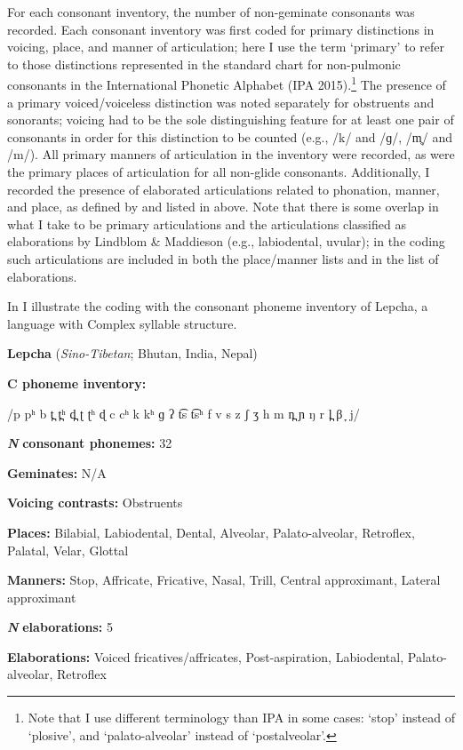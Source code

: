  For each consonant inventory, the number of non-geminate consonants was recorded. Each consonant inventory was first coded for primary distinctions in voicing, place, and manner of articulation; here I use the term ‘primary’ to refer to those distinctions represented in the standard chart for non-pulmonic consonants in the International Phonetic Alphabet (IPA 2015).\footnote{{Note that I use different terminology than IPA in some cases: ‘stop’ instead of ‘plosive’, and ‘palato-alveolar’ instead of ‘postalveolar’.}} The presence of a primary voiced/voiceless distinction was noted separately for obstruents and sonorants; voicing had to be the sole distinguishing feature for at least one pair of consonants in order for this distinction to be counted (e.g., /k/ and /ɡ/, /m̥/ and /m/). All primary manners of articulation in the inventory were recorded, as were the primary places of articulation for all non-glide consonants. Additionally, I recorded the presence of elaborated articulations related to phonation, manner, and place, as defined by \citet{LindblomMaddieson1988} and listed in  above. Note that there is some overlap in what I take to be primary articulations and the articulations classified as elaborations by Lindblom \& Maddieson (e.g., labiodental, uvular); in the coding such articulations are included in both the place/manner lists and in the list of elaborations.

  In  I illustrate the coding with the consonant phoneme inventory of Lepcha, a language with Complex syllable structure.

\ea\label{ex:4.10}
  \textbf{Lepcha} (\textit{Sino-Tibetan}; Bhutan, India, Nepal)

\textbf{C phoneme inventory:} 

/p pʰ b t̪ t̪ʰ d̪ ʈ ʈʰ ɖ c cʰ k kʰ ɡ ʔ t͡s t͡sʰ f v s z ʃ ʒ h m n̪ ɲ ŋ r l̪ β ̞ j/

\textbf{\textit{N}} \textbf{consonant phonemes:} 32

\textbf{Geminates:} N/A

\textbf{Voicing contrasts:} Obstruents

\textbf{Places:} Bilabial, Labiodental, Dental, Alveolar, Palato-alveolar, Retroflex, Palatal, Velar, Glottal

\textbf{Manners:} Stop, Affricate, Fricative, Nasal, Trill, Central approximant, Lateral approximant

\textbf{\textit{N}} \textbf{elaborations:} 5

\textbf{Elaborations:} Voiced fricatives/affricates, Post-aspiration, Labiodental, Palato-alveolar, Retroflex
\z

